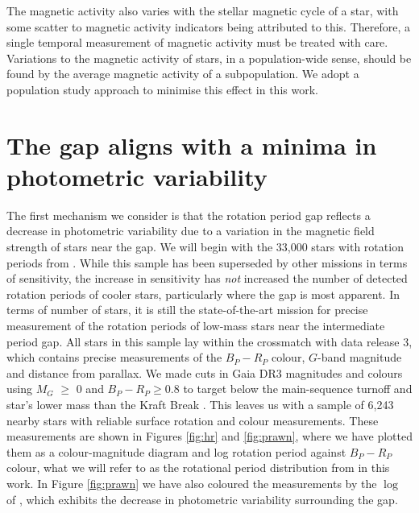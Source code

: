 The magnetic activity also varies with the stellar magnetic cycle of a star, with some scatter to magnetic activity indicators being attributed to this.
Therefore, a single temporal measurement of magnetic activity must be treated with care.
Variations to the magnetic activity of stars, in a population-wide sense, should be found by the average magnetic activity of a subpopulation.
We adopt a population study approach to minimise this effect in this work.

\section{The gap aligns with a minima in photometric variability}
\label{sec:minima_rper}

The first mechanism we consider is that the rotation period gap reflects a decrease in photometric variability due to a variation in the magnetic field strength of stars near the gap.
We will begin with the 33,000 stars with rotation periods from \citet{mcquillan_rotation_2014}.
While this sample has been superseded by other missions in terms of sensitivity, the increase in sensitivity has \textit{not} increased the number of detected rotation periods of cooler stars, particularly where the gap is most apparent.
In terms of number of stars, it is still the state-of-the-art mission for precise measurement of the rotation periods of low-mass stars near the intermediate period gap.
All stars in this sample lay within the crossmatch with \gaia{} data release 3, which contains precise measurements of the $B_P - R_P$ colour, $G$-band magnitude and distance from parallax.
We made cuts in Gaia DR3 magnitudes and colours using $M_G$ $\geq$ 0 and $B_P - R_P \geq 0.8$ to target below the main-sequence turnoff and star's lower mass than the Kraft Break \citep{kraft_studies_1967}.
This leaves us with a sample of 6,243 nearby stars with reliable surface rotation and colour measurements.
These measurements are shown in Figures \ref{fig:hr} and \ref{fig:prawn}, where we have plotted them as a colour-magnitude diagram and log rotation period against \gaia{} $B_P-R_P$ colour, what we will refer to as the rotational period distribution from in this work.
In Figure \ref{fig:prawn} we have also coloured the measurements by the $\log$ of \rper{}, which exhibits the decrease in photometric variability surrounding the gap.

